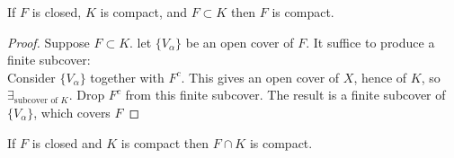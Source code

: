\begin{theorem}
	If $F$ is closed, $K$ is compact, and $F \subset K$ then $F$ is compact.
	\begin{proof}
		Suppose $F \subset K$. let $\{V_{\alpha}\}$ be an open cover of $F$. It suffice to produce a finite subcover:\\
		Consider $\{V_{\alpha}\}$ together with $F^{c}$. This gives an open cover of $X$, hence of $K$, so $\exists_{\text{subcover of $K$}}$.
		Drop $F^{c}$ from this finite subcover. The result is a finite subcover of $\{V_{\alpha}\}$, which covers $F$
	\end{proof}
	\begin{corollary}
		If $F$ is closed and $K$ is compact then $F \cap K$ is compact.
	\end{corollary}
\end{theorem}

